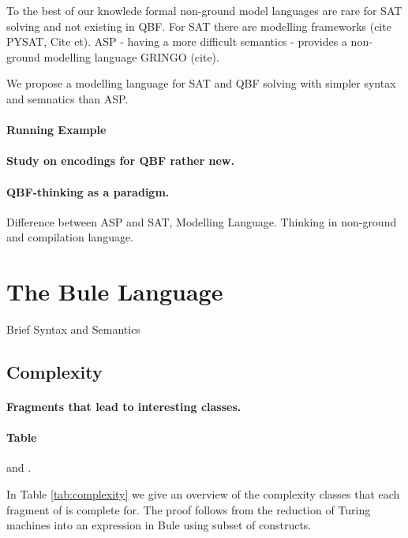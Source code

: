 \documentclass[runningheads]{llncs}
\begin{document}
To the best of our knowlede formal non-ground model languages are rare for SAT solving and not existing in QBF. 
For SAT there are modelling frameworks (cite PYSAT, Cite et). 
ASP - having a more difficult semantics - provides a non-ground modelling language GRINGO (cite).

We propose a modelling language for SAT and QBF solving with simpler syntax and semnatics than ASP. 

\paragraph{Running Example}

\paragraph{Study on encodings for QBF rather new.}

\paragraph{QBF-thinking as a paradigm.} Difference between ASP and SAT, Modelling Language. Thinking in non-ground and compilation language. 

\section{The Bule Language}

Brief Syntax and Semantics

\subsection{Complexity}

\paragraph{Fragments that lead to interesting classes.}

\paragraph{Table}

 and . 

In Table \ref{tab:complexity} we give an overview of the complexity classes
that each fragment of is complete for. The proof follows from the reduction of
Turing machines into an expression in Bule using subset of constructs.
\end{document}
